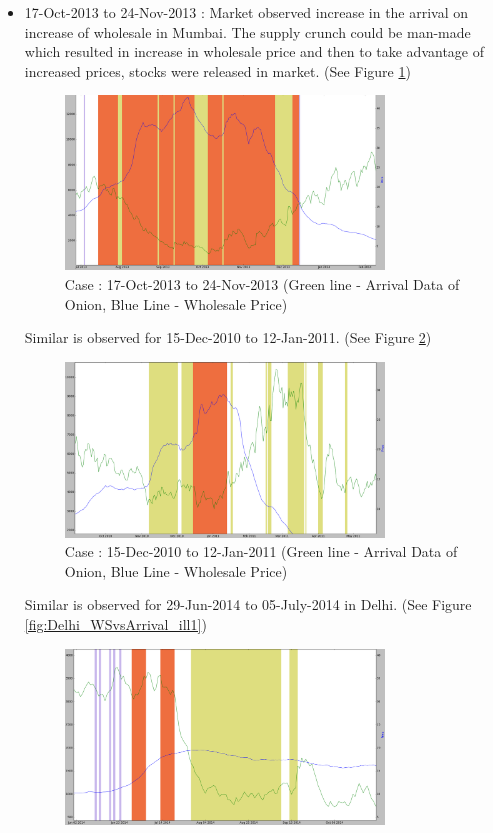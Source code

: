 \documentclass[a4paper,10pt]{article}
\begin{document}
\begin{itemize}
\item 17-Oct-2013 to 24-Nov-2013 : Market observed increase in the arrival on increase of wholesale in Mumbai. The supply crunch could be man-made which resulted in increase in wholesale price and then to take advantage of increased prices, stocks were released in market. (See Figure \ref{fig:Mumbai_WSvsArrival_ill1})
      \begin{figure}[H]
      \centering
      \includegraphics[width=0.8\textwidth]{graphs/Mumbai_WSvsArrival_ill1.png}
      \caption{Case : 17-Oct-2013 to 24-Nov-2013 (Green line - Arrival Data of Onion, Blue Line - Wholesale Price)}
      \label{fig:Mumbai_WSvsArrival_ill1}
      \end{figure}
Similar is observed for 15-Dec-2010 to 12-Jan-2011. (See Figure \ref{fig:Mumbai_WSvsArrival_ill2})
      \begin{figure}[H]
      \centering
      \includegraphics[width=0.8\textwidth]{graphs/Mumbai_WSvsArrival_ill2.png}
      \caption{Case : 15-Dec-2010 to 12-Jan-2011 (Green line - Arrival Data of Onion, Blue Line - Wholesale Price)}
      \label{fig:Mumbai_WSvsArrival_ill2}
      \end{figure}
Similar is observed for 29-Jun-2014 to 05-July-2014 in Delhi. (See Figure \ref{fig:Delhi_WSvsArrival_ill1})
      \begin{figure}[H]
      \centering
      \includegraphics[width=0.8\textwidth]{graphs/Delhi_WSvsArrival_ill1.png}

\end{figure}
\end{itemize}
\end{document}
